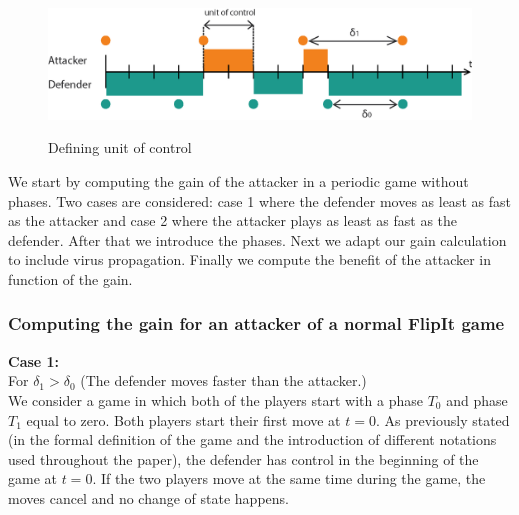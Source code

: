 \begin{figure}[hbtp]
\caption{Defining unit of control}
\centering
\includegraphics[scale=1]{Images/FlipSpel.png}
\label{fig:notations}
\end{figure}


%
%


We start by computing the gain of the attacker in a periodic game without phases. Two cases are considered: case 1 where the defender moves as least as fast as the attacker and case 2 where the attacker plays as least as fast as the defender. After that we introduce the phases. Next we adapt our gain calculation to include virus propagation. Finally we compute the benefit of the attacker in function of the gain.   
\\
\subsubsection{Computing the gain for an attacker of a normal FlipIt game}
\textbf{Case  1:} \\
For $\delta_{1} > \delta_{0}$ (The defender moves faster than the attacker.) \\

We consider a game in which both of the players start with a phase $T_{0}$ and phase $T_{1}$ equal to zero. Both players start their first move at $t=0$. As previously stated (in the formal definition of the game and the introduction of different notations used throughout the paper), the defender has control in the beginning of the game at $t=0$. If the two players move at the same time during the game, the moves cancel and no change of state happens. \\ 

